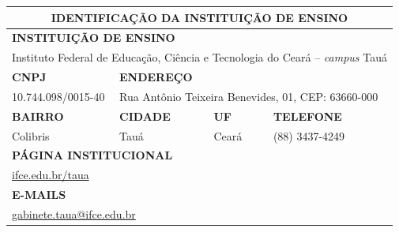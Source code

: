 \documentclass[
	12pt,				%
	openright,			%
	twoside,			%
	a4paper,			%
	chapter=TITLE,		%
	english,			%
	french,				%
	spanish,			%
	brazil,				%
	]{abntex2}
\begin{document}
\small
\noindent
\begin{tabularx}{\linewidth}{X X X X }
    
    \multicolumn{4}{c}{\textbf{IDENTIFICAÇÃO DA INSTITUIÇÃO DE ENSINO}} \\
    \toprule
     \multicolumn{4}{l}{\cellcolor{gray!20}\textbf{INSTITUIÇÃO DE ENSINO}} \\
    \multicolumn{4}{l}{Instituto Federal de Educação, Ciência e Tecnologia do Ceará -- \textit{campus} Tauá} \\ 
     
     \cellcolor{gray!20} \textbf{CNPJ} & \multicolumn{3}{l}{\cellcolor{gray!20}\textbf{ENDEREÇO}} \\
     10.744.098/0015-40 & \multicolumn{3}{l}{Rua Antônio Teixeira Benevides, 01, CEP: 63660-000} \\ 
     
    \cellcolor{gray!20} \textbf{BAIRRO} & \cellcolor{gray!20} \textbf{CIDADE} & \cellcolor{gray!20} \textbf{UF} & \cellcolor{gray!20} \textbf{TELEFONE} \\
     
     Colibris & Tauá & Ceará & (88) 3437-4249\\

     \multicolumn{4}{l}{\cellcolor{gray!20}\textbf{PÁGINA INSTITUCIONAL}} \\
     \multicolumn{4}{l}{\href{http://ifce.edu.br/taua}{ifce.edu.br/taua}} \\
     
     
     \multicolumn{4}{l}{\cellcolor{gray!20}\textbf{E-MAILS}} \\
     \multicolumn{4}{l}{\href{mailto:gabinete.taua@ifce.edu.br}{gabinete.taua@ifce.edu.br}} \\
     
     \bottomrule
     
\end{tabularx}
\vspace{2em}
\noindent
\end{document}
